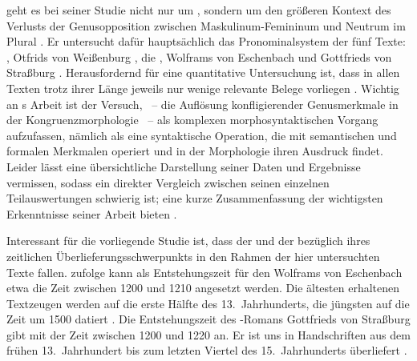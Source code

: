 \citet{askedal1973} geht es bei seiner Studie nicht nur um
, sondern um den größeren Kontext des Verlusts der
Genusopposition zwischen Maskulinum-Femininum und Neutrum im
Plural \autocite[169--177]{askedal1973}. Er
untersucht dafür hauptsächlich das Pronominalsystem der fünf Texte:
, Otfrids von Weißenburg
, die , Wolframs von
Eschenbach  und Gottfrieds von
Straßburg . Herausfordernd für eine
quantitative Untersuchung ist, dass in allen Texten trotz ihrer Länge jeweils
nur wenige relevante Belege vorliegen
\autocites[187]{askedal1973}[118]{fleischerschallert2011}. Wichtig an
\citeauthor{askedal1973}s Arbeit ist der Versuch, ~-- die Auflösung konfligierender
Genusmerkmale in der Kongruenz\-morphologie \autocites(siehe
){corbett1983}~-- als komplexen morphosyntaktischen
Vorgang aufzufassen, nämlich als eine syntaktische Operation, die mit
semantischen und formalen
Merkmalen operiert und in der Morphologie ihren
Ausdruck findet. Leider lässt \citet{askedal1973} eine übersichtliche
Darstellung seiner Daten und Ergebnisse vermissen, sodass ein direkter
Vergleich zwischen seinen einzelnen Teilauswertungen schwierig ist; eine kurze
Zusammenfassung der wichtigsten Erkenntnisse seiner Arbeit bieten
\citet[118--119]{fleischerschallert2011}.

Interessant für die vorliegende Studie ist, dass der  und der
 bezüglich ihres zeitlichen
Überlieferungsschwerpunkts in den Rahmen der hier
untersuchten Texte fallen. \citet[1378]{bumke1999} zufolge kann als
Entstehungszeit für den  Wolframs von Eschenbach etwa die Zeit
zwischen 1200 und 1210 angesetzt werden. Die ältesten erhaltenen Textzeugen
werden auf die erste Hälfte des 13.~Jahrhunderts, die jüngsten auf die Zeit um
1500 datiert
\autocites[1381]{bumke1999}[vgl.~auch][s.\,v.~\textit{Wolfram von Eschenbach:
}]{hsc}. Die Entstehungszeit des -Romans Gottfrieds
von Straßburg gibt \citet[155]{kuhn1982} mit der
Zeit zwischen 1200 und 1220 an. Er ist uns in Handschriften aus dem frühen
13.~Jahrhundert bis zum letzten Viertel des 15.~Jahrhunderts überliefert
\autocite[vgl.][s.\,v.~\textit{Gottfried von Straßburg: }]{hsc}.


